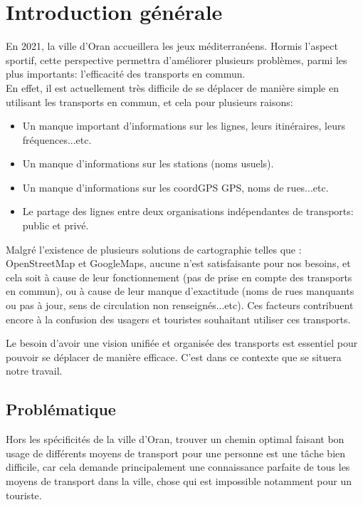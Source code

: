 \renewcommand\labelitemi{-}
\renewcommand\labelitemii{$\circ$}
\renewcommand{\thesection}{\arabic{section}}
\chapter*{Introduction générale}

En 2021, la ville d'Oran accueillera les jeux méditerranéens. Hormis l'aspect sportif, cette perspective permettra d'améliorer plusieurs problèmes, parmi les plus importants: l'efficacité des transports en commun.\\
En effet, il est actuellement très difficile de se déplacer de manière simple en utilisant les transports en commun, et cela pour plusieurs raisons:
\begin{itemize}
	\item Un manque important d'informations sur les lignes, leurs itinéraires, leurs fréquences...etc.
	\item Un manque d'informations sur les stations (noms usuels).
	\item Un manque d'informations sur les \gls{coordGPS} \gls{GPS}, noms de rues...etc.
	\item Le partage des lignes entre deux organisations indépendantes de transports: public et privé.
\end{itemize}
Malgré l'existence de plusieurs solutions de \gls{cartographie} telles que : \gls{OpenStreetMap} et \gls{GoogleMaps}, aucune n'est satisfaisante pour nos besoins, et cela soit à cause de leur fonctionnement (pas de prise en compte des transports en commun), ou à cause de leur manque d'exactitude (noms de rues manquants ou pas à jour, sens de circulation non renseignés...etc). Ces facteurs contribuent encore à la confusion des usagers et touristes souhaitant utiliser ces transports.

Le besoin d'avoir une vision unifiée et organisée des transports est essentiel pour pouvoir se déplacer de manière efficace. C'est dans ce contexte que se situera notre travail.\\

\renewcommand\labelitemi{$\bullet$}
\section{Problématique}
Hors les spécificités de la ville d'Oran, trouver un chemin optimal faisant bon usage de différents moyens de transport pour une personne est une tâche bien difficile, car cela demande principalement une connaissance parfaite de tous les moyens de transport dans la ville, chose qui est impossible notamment pour un touriste.\newline

